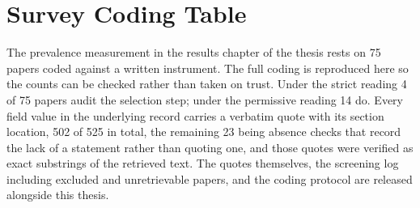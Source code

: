 \chapter{Survey Coding Table}
\label{app:survey}

The prevalence measurement in the results chapter of the thesis rests on 75 papers coded
against a written instrument. The full coding is reproduced here so the counts can be checked
rather than taken on trust. Under the strict reading
4 of 75 papers audit the selection step; under the permissive reading
14 do. Every field value in the underlying record carries a verbatim quote with its section
location, 502 of 525 in total, the remaining 23 being absence checks that record the lack of a statement rather than quoting one, and those quotes were verified as exact substrings of the retrieved
text. The quotes themselves, the screening log including excluded and unretrievable papers, and
the coding protocol are released alongside this thesis.

